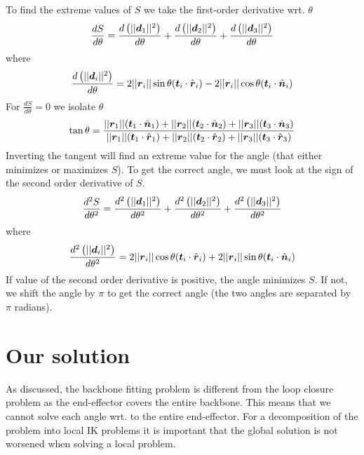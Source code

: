 To find the extreme values of $S$ we take the first-order derivative wrt. $\theta$
$$\dfrac{dS}{d\theta} = \dfrac{d\left(||\boldsymbol{d}_1||^2\right)}{d\theta} + \dfrac{d\left(||\boldsymbol{d}_2||^2\right)}{d\theta} + \dfrac{d\left(||\boldsymbol{d}_3||^2\right)}{d\theta}$$
where
$$\dfrac{d\left(||\boldsymbol{d}_i||^2\right)}{d\theta} = 2||\boldsymbol{r}_i||\sin\theta(\boldsymbol{t}_i\cdot\hat{\boldsymbol{r}}_i) - 2||\boldsymbol{r}_i||\cos\theta(\boldsymbol{t}_i\cdot\hat{\boldsymbol{n}}_i)$$
For $\frac{dS}{d\theta} = 0$ we isolate $\theta$
\begin{eqnarray*}
\tan\theta = \dfrac{||\boldsymbol{r}_1||(\boldsymbol{t}_1\cdot\hat{\boldsymbol{n}}_1) + ||\boldsymbol{r}_2||(\boldsymbol{t}_2\cdot\hat{\boldsymbol{n}}_2) + ||\boldsymbol{r}_3||(\boldsymbol{t}_3\cdot\hat{\boldsymbol{n}}_3)}{||\boldsymbol{r}_1||(\boldsymbol{t}_1\cdot\hat{\boldsymbol{r}}_1) + ||\boldsymbol{r}_2||(\boldsymbol{t}_2\cdot\hat{\boldsymbol{r}}_2) + ||\boldsymbol{r}_3||(\boldsymbol{t}_3\cdot\hat{\boldsymbol{r}}_3)}
\\
\end{eqnarray*}
Inverting the tangent will find an extreme value for the angle (that either minimizes or maximizes $S$).
To get the correct angle, we must look at the sign of the second order derivative of $S$.
\begin{eqnarray*}
\dfrac{d^2S}{d\theta^2} = \dfrac{d^2\left(||\boldsymbol{d}_1||^2\right)}{d\theta^2} + \dfrac{d^2\left(||\boldsymbol{d}_2||^2\right)}{d\theta^2} + \dfrac{d^2\left(||\boldsymbol{d}_3||^2\right)}{d\theta^2}
\end{eqnarray*}
where 
\begin{eqnarray*}
\dfrac{d^2\left(||\boldsymbol{d}_i||^2\right)}{d\theta^2} = 2||\boldsymbol{r}_i||\cos\theta(\boldsymbol{t}_i\cdot\hat{\boldsymbol{r}}_i) + 2||\boldsymbol{r}_i||\sin\theta(\boldsymbol{t}_i\cdot\hat{\boldsymbol{n}}_i)
\end{eqnarray*}
If value of the second order derivative is positive, the angle minimizes $S$. 
If not, we shift the angle by $\pi$ to get the correct angle (the two angles are separated by $\pi$ radians).



\section{Our solution}
As discussed, the backbone fitting problem is different from the loop closure problem as the end-effector covers the entire backbone. 
This means that we cannot solve each angle wrt. to the entire end-effector.
For a decomposition of the problem into local IK problems it is important that  the global solution is not worsened when solving a local problem.

